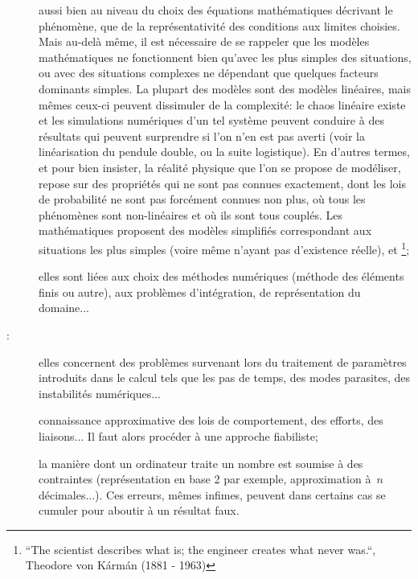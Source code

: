 \begin{description}
  \item[] aussi bien au niveau du choix des équations mathématiques décrivant le phénomène, que de la représentativité des conditions aux limites choisies. Mais au-delà même, il est nécessaire de se rappeler que les modèles mathématiques ne fonctionnent bien qu'avec les plus simples des situations, ou avec des situations complexes ne dépendant que quelques facteurs dominants simples. La plupart des modèles sont des modèles linéaires, mais mêmes ceux-ci peuvent dissimuler de la complexité: le chaos linéaire existe et les simulations numériques d'un tel système peuvent conduire à des résultats qui peuvent surprendre si l'on n'en est pas averti (voir la linéarisation du pendule double, ou la suite logistique).
  En d'autres termes, et pour bien insister, la réalité physique que l'on se propose de modéliser, repose sur des propriétés qui ne sont pas connues exactement, dont les lois de probabilité ne sont pas forcément connues non plus, où tous les phénomènes sont non-linéaires et où ils sont tous couplés. Les mathématiques proposent des modèles simplifiés correspondant aux situations les plus simples (voire même n'ayant pas d'existence réelle), et \footnote{“The scientist describes what is; the engineer creates what never was.“, Theodore von Kármán (1881 - 1963)};
  \item[] elles sont liées aux choix des méthodes numériques (méthode des éléments finis ou autre), aux problèmes d'intégration, de représentation du domaine...
  \item[:] elles concernent des problèmes survenant lors du traitement de paramètres introduits dans le calcul tels que les pas de temps, des modes parasites, des instabilités numériques...
  \item[] connaissance approximative des lois de comportement, des efforts, des liaisons... Il faut alors procéder à une approche fiabiliste;
  \item[] la manière dont un ordinateur traite un nombre est soumise à des contraintes (représentation en base 2 par exemple, approximation à~$n$ décimales...). Ces erreurs, mêmes infimes, peuvent dans certains cas se cumuler pour aboutir à un résultat faux.
\end{description}

